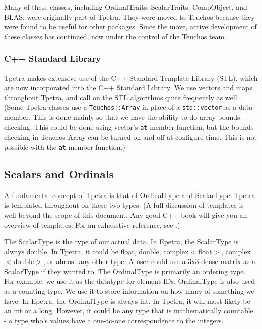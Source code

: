 \documentclass[10pt,relax]{TpetraDesign}
\begin{document}
Many of these classes, including OrdinalTraits, ScalarTraits, CompObject, and BLAS, were originally part of Tpetra. They were moved to Teuchos because they were found to be useful for other packages. Since the move, active development of these classes has continued, now under the control of the Teuchos team.

\subsubsection*{C++ Standard Library}
Tpetra makes extensive use of the C++ Standard Template Library (STL), which are now incorporated into the C++ Standard Library. We use vectors and maps throughout Tpetra, and call on the STL algorithms quite frequently as well. (Some Tpetra classes use a \texttt{Teuchos::Array} in place of a \texttt{std::vector} as a data member. This is done mainly so that we have the ability to do array bounds checking. This could be done using vector's \texttt{at} member function, but the bounds checking in Teuchos Array can be turned on and off at configure time. This is not possible with the \texttt{at} member function.)

%
\subsection{Scalars and Ordinals}
A fundamental concept of Tpetra is that of OrdinalType and ScalarType. Tpetra is templated throughout on these two types. (A full discussion of templates is well beyond the scope of this document. Any good C++ book will give you an overview of templates. For an exhaustive reference, see \cite{Templates-Complete-Guide}.)

The ScalarType is the type of our actual data. In Epetra, the ScalarType is always double. In Tpetra, it could be float, double, complex$<$float$>$, complex$<$double$>$, or almost any other type. A user could use a 3x3 dense matrix as a ScalarType if they wanted to. The OrdinalType is primarily an ordering type. For example, we use it as the datatype for element IDs. OrdinalType is also used as a counting type. We use it to store information on how many of something we have. In Epetra, the OrdinalType is always int. In Tpetra, it will most likely be an int or a long. However, it could be any type that is mathematically countable - a type who's values have a one-to-one correspondence to the integers.
\end{document}
